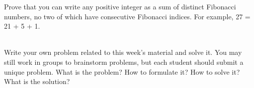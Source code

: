 \documentclass[11pt]{article}
\newif\ifsolutions
\begin{document}
\begin{qunlist}
Prove that you can write any positive integer as a sum of distinct Fibonacci
numbers, no two of which have consecutive Fibonacci indices. For example, 27 = 21 + 5 + 1.

\ifsolutions
\textbf{Solution sketch:} you always subtract the largest Fibonacci
number you can from the number. At no time will you subtract two consecutive
elements, because if you do, you could have taken out the next Fibonacci
number at first.
\fi

 \\

Write your own problem related to this week's material and solve it. You may still work in groups to brainstorm problems, but each student should submit a unique problem. What is the problem? How to formulate it? How to
solve it? What is the solution?


\end{qunlist}
\end{document}
